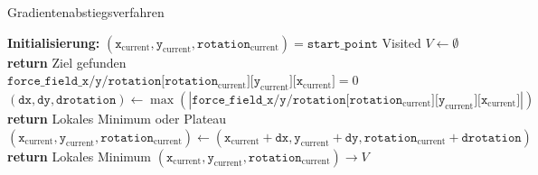 \begin{algorithm}
\caption{Gradientenabstiegsverfahren}
\begin{algorithmic}[1]
    \State \textbf{Initialisierung:}
    \State \hspace{\algorithmicindent} $(\texttt{x}_{\text{current}}, \texttt{y}_{\text{current}}, \texttt{rotation}_{\text{current}}) = \texttt{start\_point}$
    \State \hspace{\algorithmicindent} Visited $V \leftarrow \emptyset$
	\vspace*{0.3cm}
            \State \textbf{return} Ziel gefunden
        \EndIf
		\vspace*{0.1cm}
        \State $\texttt{force\_field\_x/y/rotation}\texttt{[}\texttt{rotation}_{\text{current}}\texttt{][}\texttt{y}_{\text{current}}\texttt{][}\texttt{x}_{\text{current}}\texttt{]} = 0$
        \State $(\texttt{dx}, \texttt{dy}, \texttt{drotation}) \gets \max(|\texttt{force\_field\_x/y/rotation}\texttt{[}\texttt{rotation}_{\text{current}}\texttt{][}\texttt{y}_{\text{current}}\texttt{][}\texttt{x}_{\text{current}}\texttt{]}|)$
		\vspace*{-0.3cm}
            \State \textbf{return} Lokales Minimum oder Plateau
        \EndIf
     	\vspace*{0.1cm}
        \State $(\texttt{x}_{\text{current}}, \texttt{y}_{\text{current}}, \texttt{rotation}_{\text{current}}) \gets (\texttt{x}_{\text{current}} + \texttt{dx}, \texttt{y}_{\text{current}} + \texttt{dy}, \texttt{rotation}_{\text{current}} + \texttt{drotation})$
		\vspace*{-0.3cm}
            \State \textbf{return} Lokales Minimum
		\Else
			\State $(\texttt{x}_{\text{current}}, \texttt{y}_{\text{current}}, \texttt{rotation}_{\text{current}}) \rightarrow V$
        \EndIf
    \EndWhile
\end{algorithmic}
\end{algorithm}

